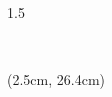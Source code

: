 



\begin{titlepage}

\begin{spacing}{1.5}

    \centering

    {\large \Instituicao}\\[-4pt]
    {\large \Escola}

    \vspace{0.8cm}

    {\normalsize \textbf{\TipoRelatorio}}

    \vspace{0.8cm}

    {\large \textbf{\MakeUppercase{\TituloPortugues}}}

    \vspace{0.3cm}

    {\large \textbf{\MakeUppercase{\TituloIngles}}}

    \noindent\makebox[\linewidth]{\rule{\textwidth}{0.4pt}}

    \begin{flushleft}
    
        \estudante{\EstudanteUm}
    
        \vspace{0.2cm}
    
        \estudante{\EstudanteDois}
    
        \vspace{0.2cm}
    
        \coorientadores
    
        \vspace{0.2cm}

        \orientador
    
    \end{flushleft}

    \begin{textblock*}{\textwidth}(2.5cm, 26.4cm)
        \centering
        {\small \Data}\\[-4pt]
        {\small \Local}
    \end{textblock*}

\end{spacing}

\end{titlepage}